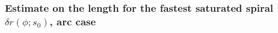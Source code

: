 \documentclass[reqno]{amsart}
\theoremstyle{definition} \newtheorem{definition}{Definition}[section]
\theoremstyle{definition} \newtheorem{remark}[definition]{Remark}
\theoremstyle{plain} \newtheorem{lemma}[definition]{Lemma}
\theoremstyle{plain} \newtheorem{proposition}[definition]{Proposition}
\theoremstyle{plain} \newtheorem{theorem}[definition]{Theorem}
\theoremstyle{plain} \newtheorem{corollary}[definition]{Corollary}
\theoremstyle{definition} \newtheorem{example}[definition]{Example}
\theoremstyle{plain} \newtheorem{claim}[clai]{Claim}
\theoremstyle{definition} \newtheorem{assumption}[definition]{Assumption}
\theoremstyle{definition} \newtheorem{observation}[definition]{Observation}
\newcommand{\1}{\mathbbm 1}
\numberwithin{equation}{section} %
\theoremstyle{plain} \newtheorem*{theorem*}{Theorem}
\theoremstyle{plain} \newtheorem{mthm}[maintheorem]{Main Theorem}
\theoremstyle{plain} \newtheorem*{mthm*}{Main Theorem}
\theoremstyle{plain} \newtheorem*{conjecture*}{Conjecture}
\theoremstyle{plain} \newtheorem{conjecture}[definition]{Conjecture}
\theoremstyle{plain} \newtheorem*{problem*}{Problem}
\begin{document}
%



\subsubsection{Estimate on the length for the fastest saturated spiral $\delta r(\phi;s_0)$, arc case}
\label{Sss:additional_estim_opt_arc}
\end{document}
